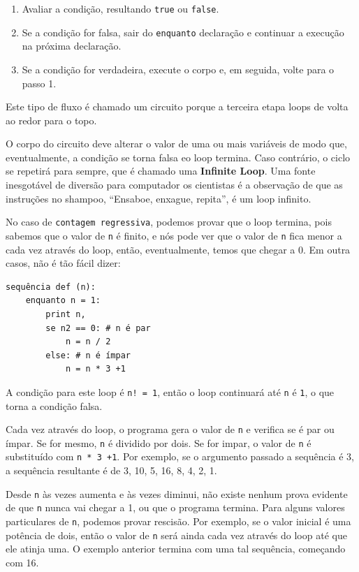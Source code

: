 \documentclass[10pt]{book}
\begin{document}
\begin{exercise}
{{\begin{enumerate}

\item Avaliar a condição, resultando {\tt true} ou {\tt false}.

\item Se a condição for falsa, sair do {\tt enquanto} declaração
e continuar a execução na próxima declaração.

\item Se a condição for verdadeira, execute o
corpo e, em seguida, volte para o passo 1.

\end{enumerate}

Este tipo de fluxo é chamado um circuito {\bf} porque a terceira etapa
loops de volta ao redor para o topo.  

O corpo do circuito deve alterar o valor de uma ou mais variáveis
de modo que, eventualmente, a condição se torna falsa eo loop
termina. Caso contrário, o ciclo se repetirá para sempre, que é chamado
uma {\bf Infinite Loop}. Uma fonte inesgotável de diversão para computador
os cientistas é a observação de que as instruções no shampoo,
``Ensaboe, enxague, repita'', é um loop infinito.

No caso de {\tt contagem regressiva}, podemos provar que o loop
termina, pois sabemos que o valor de {\tt n} é finito, e nós
pode ver que o valor de {\tt n} fica menor a cada vez através do
loop, então, eventualmente, temos que chegar a 0. Em outra
casos, não é tão fácil dizer:

\begin{verbatim}
sequência def (n):
    enquanto n = 1:
        print n,
        se n2 == 0: # n é par
            n = n / 2
        else: # n é ímpar
            n = n * 3 +1
\end{verbatim}
%
A condição para este loop é {\tt n! = 1}, então o loop continuará
até {\tt n} é {\tt 1}, o que torna a condição falsa.

Cada vez através do loop, o programa gera o valor de {\tt n}
e verifica se é par ou ímpar. Se for mesmo, {\tt n} é
dividido por dois. Se for impar, o valor de {\tt n} é substituído com
{\tt n * 3 +1}. Por exemplo, se o argumento passado
a sequência {\tt} é 3, a sequência resultante é de 3, 10, 5, 16, 8, 4, 2, 1.

Desde {\tt n} às vezes aumenta e às vezes diminui, não existe nenhum
prova evidente de que {\tt n} nunca vai chegar a 1, ou que o programa
termina. Para alguns valores particulares de {\tt n}, podemos provar
rescisão. Por exemplo, se o valor inicial é uma potência de dois,
então o valor de {\tt n} será ainda cada vez através do loop
até que ele atinja uma. O exemplo anterior termina com uma tal sequência,
começando com 16.

}}
\end{exercise}
\end{document}
